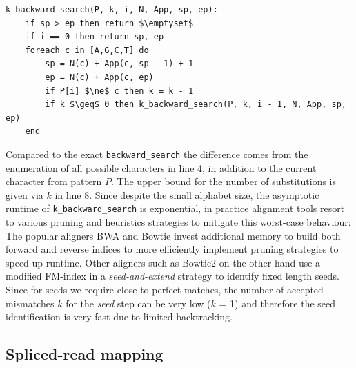 \begin{lstlisting}[caption={A pseudocode implementation of a recursive inexact \texttt{k\_backward\_search} of pattern $P$ through the BWT $T^{BWT}$ of text $T$ enumerating all possible character combinations during each recursion step up to an upper bound of mismatches $k$.},captionpos=b, label={lst:k_backward_search}]
k_backward_search(P, k, i, N, App, sp, ep):
	if sp > ep then return $\emptyset$
	if i == 0 then return sp, ep
	foreach c in [A,G,C,T] do
		sp = N(c) + App(c, sp - 1) + 1
		ep = N(c) + App(c, ep)
		if P[i] $\ne$ c then k = k - 1
		if k $\geq$ 0 then k_backward_search(P, k, i - 1, N, App, sp, ep)
	end
\end{lstlisting}

Compared to the exact \texttt{backward\_search} the difference comes from the enumeration of all possible characters in line 4, in addition to the current character from pattern $P$. The upper bound for the number of substitutions is given via $k$ in line 8. Since despite the small alphabet size, the asymptotic runtime of \texttt{k\_backward\_search} is exponential, in practice alignment tools resort to various pruning and heuristics strategies to mitigate this worst-case behaviour: The popular aligners BWA \citep{Li2009FastTransform} and Bowtie \citep{Langmead} invest additional memory to build both forward and reverse indices to more efficiently implement pruning strategies to speed-up runtime. Other aligners such as Bowtie2 \citep{Langmead2012Fast2} on the other hand use a modified FM-index in a \textit{seed-and-extend} strategy to identify fixed length seeds. Since for seeds we require close to perfect matches, the number of accepted mismatches $k$ for the \textit{seed} step can be very low ($k$ = 1) and therefore the seed identification is very fast due to limited backtracking.

\subsection{Spliced-read mapping}

